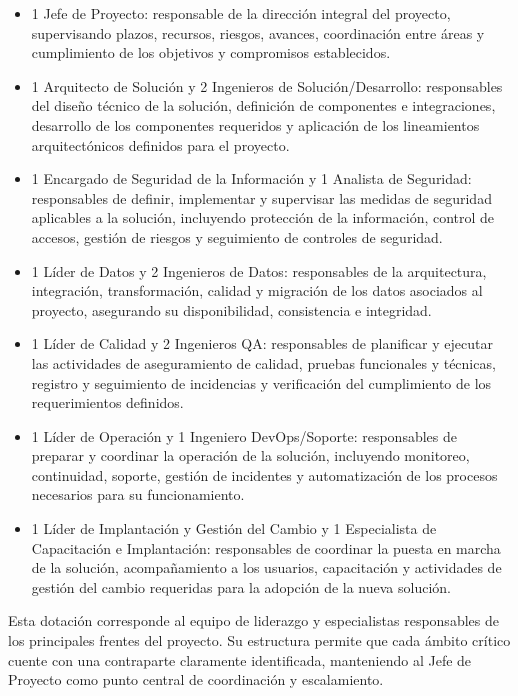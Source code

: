 \documentclass[11pt]{article}
\providecommand{\tightlist}{%
  \setlength{\itemsep}{0pt}\setlength{\parskip}{0pt}}
\begin{document}
\begin{itemize}
\tightlist
\item
  1 Jefe de Proyecto: responsable de la dirección integral del proyecto, supervisando plazos, recursos, riesgos, avances, coordinación entre áreas y cumplimiento de los objetivos y compromisos establecidos.
\item
  1 Arquitecto de Solución y 2 Ingenieros de Solución/Desarrollo: responsables del diseño técnico de la solución, definición de componentes e integraciones, desarrollo de los componentes requeridos y aplicación de los lineamientos arquitectónicos definidos para el proyecto.
\item
  1 Encargado de Seguridad de la Información y 1 Analista de Seguridad: responsables de definir, implementar y supervisar las medidas de seguridad aplicables a la solución, incluyendo protección de la información, control de accesos, gestión de riesgos y seguimiento de controles de seguridad.
\item
  1 Líder de Datos y 2 Ingenieros de Datos: responsables de la arquitectura, integración, transformación, calidad y migración de los datos asociados al proyecto, asegurando su disponibilidad, consistencia e integridad.
\item
  1 Líder de Calidad y 2 Ingenieros QA: responsables de planificar y ejecutar las actividades de aseguramiento de calidad, pruebas funcionales y técnicas, registro y seguimiento de incidencias y verificación del cumplimiento de los requerimientos definidos.
\item
  1 Líder de Operación y 1 Ingeniero DevOps/Soporte: responsables de preparar y coordinar la operación de la solución, incluyendo monitoreo, continuidad, soporte, gestión de incidentes y automatización de los procesos necesarios para su funcionamiento.
\item
  1 Líder de Implantación y Gestión del Cambio y 1 Especialista de Capacitación e Implantación: responsables de coordinar la puesta en marcha de la solución, acompañamiento a los usuarios, capacitación y actividades de gestión del cambio requeridas para la adopción de la nueva solución.
\end{itemize}

Esta dotación corresponde al equipo de liderazgo y especialistas responsables de los principales frentes del proyecto. Su estructura permite que cada ámbito crítico cuente con una contraparte claramente identificada, manteniendo al Jefe de Proyecto como punto central de coordinación y escalamiento.
\end{document}
